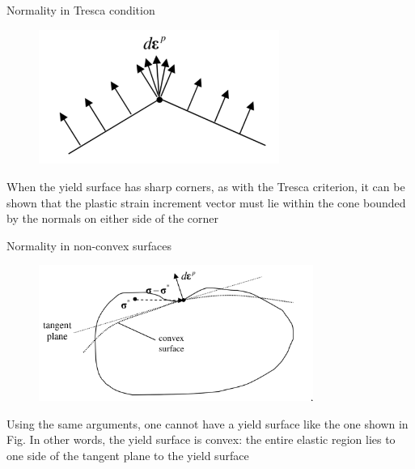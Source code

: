 \documentclass[handout]{beamer}
\begin{document}
\begin{frame}{Normality in Tresca condition}
	\begin{figure}
		\includegraphics[width=0.7\textwidth]{figs/tresca-corner.png}
	\end{figure}
When the yield surface has sharp corners, as with the Tresca criterion, it can be shown that the plastic strain increment vector must lie within the cone bounded by the normals on either side of the corner
\end{frame}


\begin{frame}{Normality in non-convex surfaces}
	\begin{figure}
		\includegraphics[width=0.8\textwidth]{figs/non-convex-yield.png}
	\end{figure}
Using the same arguments, one cannot have a yield surface like the one shown in Fig.  In other words, the yield surface is convex: the entire elastic region lies to one side of the tangent plane to the yield surface
\end{frame}
\end{document}
